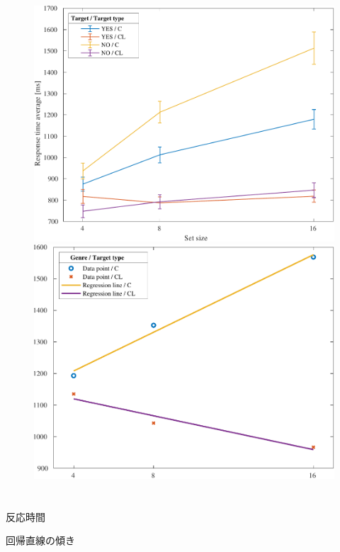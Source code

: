 \begin{figure}
\begin{minipage}{.34\textwidth}
        \includegraphics[keepaspectratio,width=\textwidth]{../../Figures/14_01_graph.pdf}
    \end{minipage}
    \begin{minipage}{.34\textwidth}
        \centering
        \includegraphics[keepaspectratio,width=\textwidth]{../../Figures/14_02_graph.pdf}
    \end{minipage}
\end{figure}
\section{\result}
\begin{table}[H]
    \centering
    \caption{反応時間}
    \fontsize{4}{3}\selectfont\ttfamily
    
\end{table}
\begin{table}[H]
    \centering
    \caption{回帰直線の傾き}
    \fontsize{4}{1}\selectfont\ttfamily
    
\end{table}
